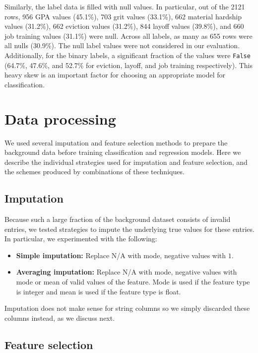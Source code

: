 \documentclass{article} %
\begin{document}
Similarly, the label data is filled with null values. In particular, out of the 2121 rows, 956 GPA values (45.1\%), 703 grit values (33.1\%), 662 material hardship values (31.2\%), 662 eviction values (31.2\%), 844 layoff values (39.8\%), and 660 job training values (31.1\%) were null. Across all labels, as many as 655 rows were all nulls (30.9\%). The null label values were not considered in our evaluation. Additionally, for the binary labels, a significant fraction of the values were \texttt{False} (64.7\%, 47.6\%, and 52.7\% for eviction, layoff, and job training respectively). This heavy skew is an important factor for choosing an appropriate model for classification.

\section{Data processing}
\label{sec:datapreprocessing}

We used several imputation and feature selection methods to prepare the background data before training classification and regression models. Here we describe the individual strategies used for imputation and feature selection, and the schemes produced by combinations of these techniques.

\subsection{Imputation}
\label{sec:imputation}

Because such a large fraction of the background dataset consists of invalid entries, we tested strategies to impute the underlying true values for these entries. In particular, we experimented with the following:

\begin{itemize}
\item \textbf{Simple imputation:} Replace N/A with mode, negative values with $1$.
\item \textbf{Averaging imputation:} Replace N/A with mode, negative values with mode or mean of valid values of the feature. Mode is used if the feature type is integer and mean is used if the feature type is float.
\end{itemize}

Imputation does not make sense for string columns so we simply discarded these columns instead, as we discuss next.

\subsection{Feature selection}
\label{sec:featureselection}
\end{document}
